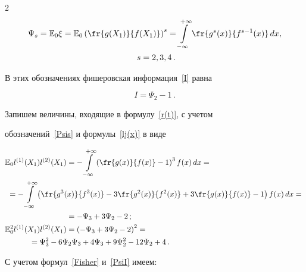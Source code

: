 \begin{multicols}{2}
\begin{multline}
\Psi_s=\E_0\xi=\E_0\left(\fr{g(X_1)}{f(X_1)}\right)^s=

\int\limits_{-\infty}^{+\infty}\fr{g^s(x)}{f^{s-1}(x)}\,dx,

\\ \ s=2,3,4\,.

\end{multline}

В этих обозначениях фишеровская информация~\eqref{I} равна



\noindent

\begin{equation}

\label{PsiI}

I=\Psi_2-1\,.

\end{equation}

Запишем величины, входящие в формулу~\eqref{r(t)}, с учетом

обозначений~\eqref{Psis} и формулы~\eqref{lj(x)} в виде



\noindent

\begin{align*}

\!\E_0 l^{(1)}(X_1)l^{(2)}(X_1)&=-\int\limits_{-\infty}^{+\infty}

\left(\fr{g(x)}{f(x)}-1\right)^3f(x)\,dx={}\hspace*{-1.25272pt}\\

&\hspace*{-27mm}{}=-\int\limits_{-\infty}^{+\infty}\left(\fr{g^3(x)}{f^3(x)}-3\fr{g^2(x)}{f^2(x)}

+3\fr{g(x)}{f(x)}-1\right)f(x)\,dx={}\\

&{}=-\Psi_3+3\Psi_2-2\,;\\

\E_0^2l^{(1)}(X_1)l^{(2)}(X_1)&=\left(-\Psi_3+3\Psi_2-2\right)^2={}\\

&\hspace*{-17mm}{}=\Psi_3^2-6\Psi_2\Psi_3+4\Psi_3+9\Psi_2^2-12\Psi_2+4\,.

\end{align*}





\noindent

С учетом формул~\eqref{Fisher} и~\eqref{PsiI} имеем:


\end{multicols}

